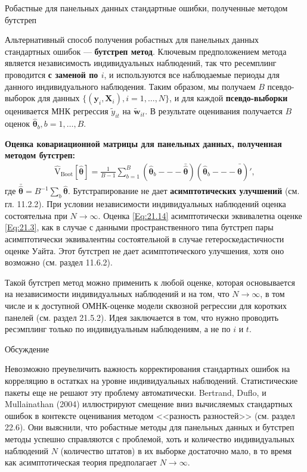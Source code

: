 {\centering
Робастные для панельных данных стандартные ошибки, полученные методом бутстреп \\}

Альтернативный способ получения робастных для панельных данных стандартных ошибок --- \textbf{бутстреп метод}. Ключевым предположением метода является независимость индивидуальных наблюдений, так что ресемплинг проводится \textbf{с заменой по $i$}, и используются все наблюдаемые периоды для данного индивидуального наблюдения.
Таким образом, мы получаем $B$ псевдо-выборок для данных $\{(\mathbf y_i, \mathbf X_i), i = 1, \dots, N\}$, и для каждой \textbf{псевдо-выборки} оценивается МНК регрессия $\tilde{y}_{it}$ на $\tilde{\mathbf w}_{it}$. В результате оценивания получается $B$ оценок $\hat{\bm \theta}_b, b=1, \dots, B$.

\textbf{Оценка ковариационной матрицы для панельных данных, полученная методом бутстреп:}
\begin{align}
\hat{\mathrm V}_{\mathrm {Boot}}[\hat{\bm\theta}]=\frac{1}{B-1} \sum_{b=1}^B \left(\hat{\bm\theta}_b --- \bar{\hat{\bm\theta}} \right) \left( \hat{\bm\theta}_b --- \bar{\hat{\bm\theta}} \right)',
\label{Eq:21.14}
\end{align}
где $\bar{\bm{\hat{\theta}}}=B^{-1} \sum\nolimits_b \bm{\hat{\theta}}$. Бутстрапирование не дает \textbf{асимптотических улучшений} (см. гл. 11.2.2). При условии независимости индивидуальных наблюдений оценка состоятельна при $N \rightarrow \infty$. Оценка \ref{Eq:21.14} асимптотически эквивалетна оценке \ref{Eq:21.3}, как в случае с данными пространственного типа бутстреп пары асимптотически эквивалентны состоятельной в случае гетероскедастичности оценке Уайта. Этот бутстреп не дает асимптотического улучшения, хотя оно возможно (см. раздел 11.6.2).

Такой бутстреп метод  можно применить к любой оценке, которая основывается на независимости индивидуальных наблюдений и на том, что $N \rightarrow \infty$, в том числе и к доступной ОМНК-оценке модели сквозной регрессии для коротких панелей (см. раздел 21.5.2). Идея заключается в том, что нужно проводить ресэмплинг только по индивидуальным наблюдениям, а не по $i$ и $t$.

 
{\centering
Обсуждение\\}

Невозможно преувеличить важность корректирования стандартных ошибок на корреляцию в остатках на уровне индивидуальных наблюдений. Статистические пакеты еще не решают эту проблему автоматически. Bertrand, Duflo, и Mullainathan (2004) иллюстрируют смещение вниз вычисляемых стандартных ошибок в контексте оценивания методом <<разность разностей>> (см. раздел 22.6). Они выяснили, что робастные методы для панельных данных и бутстреп методы успешно справляются с проблемой, хоть и количество индивидуальных наблюдений $N$ (количество штатов) в их выборке достаточно мало, в то время как асимптотическая теория предполагает $N \rightarrow \infty$.

